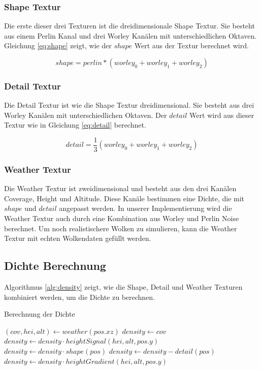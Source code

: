 \subsubsection{Shape Textur}
Die erste dieser drei Texturen ist die dreidimensionale Shape Textur. Sie besteht aus einem Perlin Kanal und drei Worley Kanälen mit unterschiedlichen Oktaven. Gleichung \ref{eq:shape} zeigt, wie der $ shape $ Wert aus der Textur berechnet wird.

\begin{equation}
    shape = perlin * (worley_0 + worley_1 + worley_2)
    \label{eq:shape}
\end{equation}

\subsubsection{Detail Textur}
Die Detail Textur ist wie die Shape Textur dreidimensional. Sie besteht aus drei Worley Kanälen mit unterschiedlichen Oktaven. Der $ detail $ Wert wird aus dieser Textur wie in Gleichung \ref{eq:detail} berechnet.

\begin{equation}
    detail = \frac{1}{3} (worley_0 + worley_1 + worley_2)
    \label{eq:detail}
\end{equation}

\subsubsection{Weather Textur}
Die Weather Textur ist zweidimensional und besteht aus den drei Kanälen Coverage, Height und Altitude. Diese Kanäle bestimmen eine Dichte, die mit $ shape $ und $ detail $ angepasst werden. In unserer Implementierung wird die Weather Textur auch durch eine Kombination aus Worley und Perlin Noise berechnet. Um noch realistischere Wolken zu simulieren, kann die Weather Textur mit echten Wolkendaten gefüllt werden.

\subsection{Dichte Berechnung}
Algorithmus \ref{alg:density} zeigt, wie die Shape, Detail und Weather Texturen kombiniert werden, um die Dichte zu berechnen.

\begin{algorithm}[H]
\caption{Berechnung der Dichte \cite{Högfeldt16}}
\label{alg:density}
\begin{algorithmic}[1]
\State $ (cov, hei, alt) \gets weather(pos.xz) $
\State $ density \gets cov $
\State $ density \gets density \cdot heightSignal(hei, alt, pos.y) $
\State $ density \gets density \cdot shape(pos) $
\State $ density \gets density - detail(pos) $
\State $ density \gets density \cdot heightGradient(hei, alt, pos.y) $
\end{algorithmic}
\end{algorithm}

